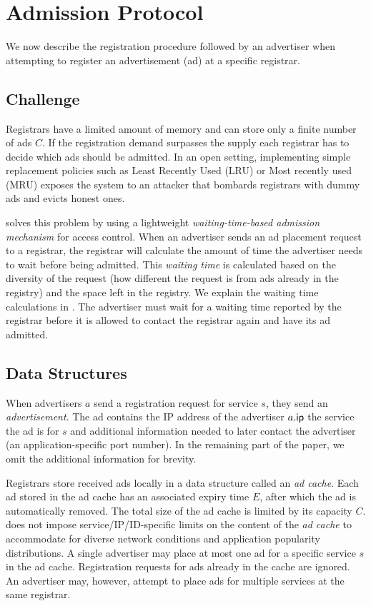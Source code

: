 
\section{Admission Protocol}
\label{sec:admission}

We now describe the registration procedure followed by an advertiser when attempting to register an advertisement (ad) at a specific registrar.

\subsection{Challenge}
Registrars have a limited amount of memory and can store only a finite number of ads $C$. If the registration demand surpasses the supply each registrar has to decide which ads should be admitted. In an open setting, implementing simple replacement policies such as Least Recently Used (LRU) or Most recently used (MRU) exposes the system to an attacker that bombards registrars with dummy ads and evicts honest ones.

\sysname solves this problem by using a lightweight \textit{waiting-time-based admission mechanism} for access control. When an advertiser sends an ad placement request to a registrar, the registrar will calculate the amount of time the advertiser needs to wait before being admitted. This \emph{waiting time} is calculated based on the diversity of the request (\ie how different the request is from ads already in the registry) and the space left in the registry. We explain the waiting time calculations in . The advertiser must wait for a waiting time reported by the registrar before it is allowed to contact the registrar again and have its ad admitted.

\subsection{Data Structures}

When advertisers $a$ send a registration request for service $s$, they send an \emph{advertisement}. The ad contains the IP address of the advertiser $a.\mathsf{ip}$ the service the ad is for $s$ and additional information needed to later contact the advertiser (\eg an application-specific port number). In the remaining part of the paper, we omit the additional information for brevity. 

Registrars store received ads locally in a data structure called an \emph{ad cache}. Each ad stored in the ad cache has an associated expiry time $E$, after which the ad is automatically removed. The total size of the ad cache is limited by its capacity $C$. \sysname does not impose service/IP/ID-specific limits on the content of the \emph{ad cache} to accommodate for diverse network conditions and application popularity distributions.
A single advertiser may place at most one ad for a specific service $s$ in the ad cache.
Registration requests for ads already in the cache are ignored.
An advertiser may, however, attempt to place ads for multiple services at the same registrar.

